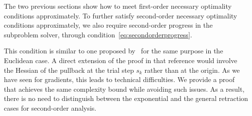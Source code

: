 The two previous sections show how to meet first-order necessary optimality conditions approximately. To further satisfy second-order necessary optimality conditions approximately, we also
require second-order progress in the subproblem solver, through condition~\eqref{eq:secondorderprogress}.

This condition is similar to one proposed by~\citet{cartis2017improved} for the same purpose in the Euclidean case.
A direct extension of the proof in that reference would involve the Hessian of the pullback at the trial step $s_k$ rather than at the origin. %
As we have seen for gradients, this leads to technical difficulties.
We provide a proof that achieves the same complexity bound while avoiding such issues.
As a result, there is no need to distinguish between the exponential and the general retraction cases for second-order analysis.



